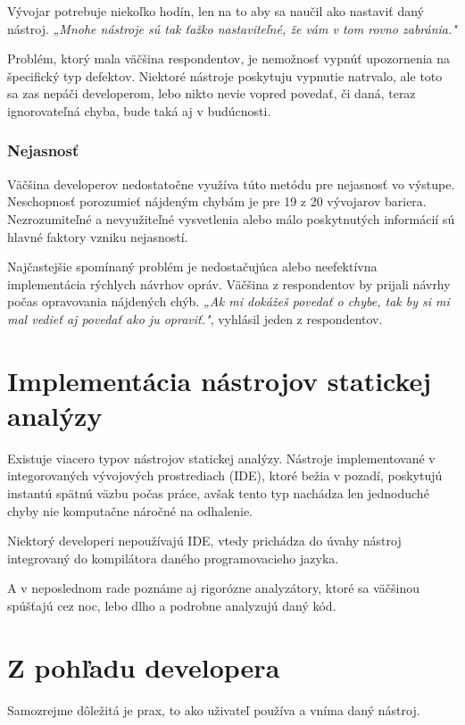 \documentclass[11pt,twoside,slovak,a4paper]{article}
\begin{document}
Vývojar potrebuje niekoľko hodín, len na to aby sa naučil ako nastaviť daný nástroj. \emph{„Mnohe nástroje sú tak ťažko nastaviteľné, že vám v tom rovno zabránia."}

Problém, ktorý mala väčšina respondentov, je nemožnosť vypnúť upozornenia na špecifický typ defektov. Niektoré nástroje
poskytuju vypnutie natrvalo, ale toto sa zas nepáči developerom, lebo nikto nevie vopred povedať, či daná, teraz
ignorovateľná chyba, bude taká aj v budúcnosti.

\subsubsection*{Nejasnosť}
Väčšina developerov nedostatočne využíva túto metódu pre nejasnosť vo výstupe. Neschopnosť porozumieť nájdeným chybám
je pre 19 z 20 vývojarov bariera. Nezrozumiteľné a nevyužiteľné vysvetlenia alebo málo poskytnutých informácií sú hlavné
faktory vzniku nejasností.

Najčastejšie spomínaný problém je nedostačujúca alebo neefektívna implementácia rýchlych návrhov opráv. Väčšina z
respondentov by prijali návrhy počas opravovania nájdených chýb. \emph{„Ak mi dokážeš povedať o chybe, tak by si mi mal
	vedieť aj povedať ako ju opraviť."}, vyhlásil jeden z respondentov.

\section{Implementácia nástrojov statickej analýzy} \label{implementacia}
Existuje viacero typov nástrojov statickej analýzy. Nástroje implementované v integorovaných vývojových prostrediach (IDE),
ktoré bežia v pozadí, poskytujú instantú spätnú väzbu počas práce, avšak tento typ nachádza len jednoduché chyby nie
komputačne náročné na odhalenie.

Niektorý developeri nepoužívajú IDE, vtedy prichádza do úvahy nástroj integrovaný do
kompilátora daného programovacieho jazyka.

A v neposlednom rade poznáme aj rigorózne analyzátory, ktoré sa väčšinou
spúšťajú cez noc, lebo dlho a podrobne analyzujú daný kód.\cite{BrittanyJohnson, LisaNguyen}

\section{Z pohľadu developera} \label{dev}
Samozrejme dôležitá je prax, to ako uživateľ používa a vníma daný nástroj\cite{LisaNguyen}.
\end{document}
